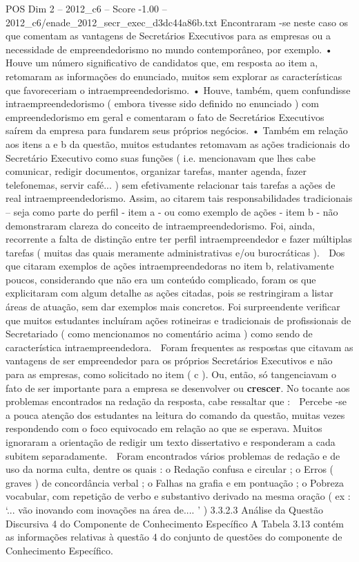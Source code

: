 \begin{textsample}{POS Dim 2 – 2012\_c6 – Score -1.00 – 2012\_c6/enade\_2012\_secr\_exec\_d3dc44a86b.txt}
Encontraram -se neste caso os que comentam as vantagens de Secretários Executivos para as empresas ou a necessidade de empreendedorismo no mundo contemporâneo, por exemplo. • Houve um número significativo de candidatos que, em resposta ao item a, retomaram as informações do enunciado, muitos sem explorar as características que favoreceriam o intraempreendedorismo. • Houve, também, quem confundisse intraempreendedorismo ( embora tivesse sido definido no enunciado ) com empreendedorismo em geral e comentaram o fato de Secretários Executivos saírem da empresa para fundarem seus próprios negócios. • Também em relação aos itens a e b da questão, muitos estudantes retomavam as ações tradicionais do Secretário Executivo como suas funções ( i.e. mencionavam que lhes cabe comunicar, redigir documentos, organizar tarefas, manter agenda, fazer telefonemas, servir café... ) sem efetivamente relacionar tais tarefas a ações de real intraempreendedorismo.
Assim, ao citarem tais responsabilidades tradicionais – seja como parte do perfil - item a - ou como exemplo de ações - item b - não demonstraram clareza do conceito de intraempreendedorismo.
Foi, ainda, recorrente a falta de distinção entre ter perfil intraempreendedor e fazer múltiplas tarefas ( muitas das quais meramente administrativas e/ou burocráticas ).  Dos que citaram exemplos de ações intraempreendedoras no item b, relativamente poucos, considerando que não era um conteúdo complicado, foram os que explicitaram com algum detalhe as ações citadas, pois se restringiram a listar áreas de atuação, sem dar exemplos mais concretos.
Foi surpreendente verificar que muitos estudantes incluíram ações rotineiras e tradicionais de profissionais de Secretariado ( como mencionamos no comentário acima ) como sendo de característica intraempreendedora.  Foram frequentes as respostas que citavam as vantagens de ser empreendedor para os próprios Secretários Executivos e não para as empresas, como solicitado no item ( c ).
Ou, então, só tangenciavam o fato de ser importante para a empresa se desenvolver ou \textbf{crescer}.
No tocante aos problemas encontrados na redação da resposta, cabe ressaltar que :  Percebe -se a pouca atenção dos estudantes na leitura do comando da questão, muitas vezes respondendo com o foco equivocado em relação ao que se esperava.
Muitos ignoraram a orientação de redigir um texto dissertativo e responderam a cada subitem separadamente.  Foram encontrados vários problemas de redação e de uso da norma culta, dentre os quais : o Redação confusa e circular ; o Erros ( graves ) de concordância verbal ; o Falhas na grafia e em pontuação ; o Pobreza vocabular, com repetição de verbo e substantivo derivado na mesma oração ( ex : ‘... vão inovando com inovações na área de.... ’ ) 3.3.2.3 Análise da Questão Discursiva 4 do Componente de Conhecimento Específico A Tabela 3.13 contém as informações relativas à questão 4 do conjunto de questões do componente de Conhecimento Específico.

\end{textsample}
